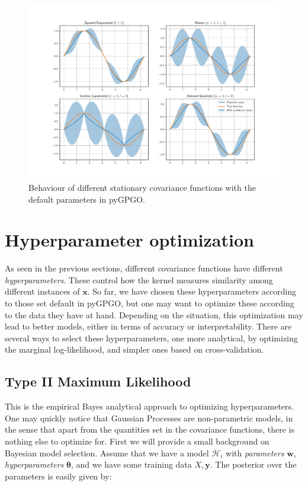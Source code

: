 \documentclass[10pt,a4paper,twoside]{book}
\begin{document}
\begin{figure}
\caption{Behaviour of different stationary covariance functions with the default parameters in pyGPGO.}
\label{fig:zoo}
\includegraphics[width=\textwidth]{figures/chapter2/zoo}
\end{figure}

\section{Hyperparameter optimization}
\label{hyper}

As seen in the previous sections, different covariance functions have different \textit{hyperparameters}. These control how the kernel measures similarity among different instances of $\boldsymbol{x}$. So far, we have chosen these hyperparameters according to those set default in pyGPGO, but one may want to optimize these according to the data they have at hand. Depending on the situation, this optimization may lead to better models, either in terms of accuracy or interpretability. There are several ways to select these hyperparameters, one more analytical, by optimizing the marginal log-likelihood, and simpler ones based on cross-validation.

\subsection{Type II Maximum Likelihood}
\label{empbayes}

This is the empirical Bayes analytical approach to optimizing hyperparameters. One may quickly notice that Gaussian Processes are non-parametric models, in the sense that apart from the quantities set in the covariance functions, there is nothing else to optimize for. First we will provide a small background on Bayesian model selection. Assume that we have a model  $\mathcal{H}_i$ with \textit{parameters} $\boldsymbol{w}$, \textit{hyperparameters} $\boldsymbol{\theta}$, and we have some training data $X, \boldsymbol{y}$. The posterior over the parameters is easily given by:
\end{document}
